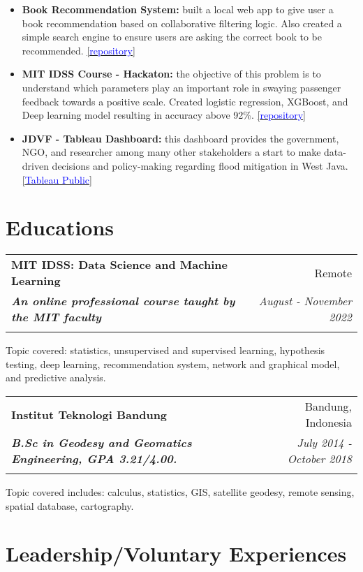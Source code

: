 \documentclass[a4paper, 11pt]{article}
\makeatletter
\newcommand{\resumeItem}[2]{
    \item\small{
        \textbf{#1}{#2 \vspace{-2pt}}
    }
}
\newcommand{\resumeSubheading}[4]{
    \vspace{-1pt}
    \begin{tabular*}{0.97\textwidth}{l@{\extracolsep{\fill}}r}
        \color{lightblue}\textbf{#1} & #2 \\
        \textbf{\textit{\small#3}} & \textit{\small #4} \\
        \textnormal{}\vspace{-5pt}
    \end{tabular*}\vspace{-5pt}
}
\newcommand{\resumeItemListStart}{\begin{itemize}[leftmargin=*]\setlength\itemsep{0em}\vspace{-1pt}}
\newcommand{\resumeItemListEnd}{\end{itemize}\vspace{-5pt}}
\makeatother
\begin{document}
    \resumeItemListStart
    \resumeItem{Book Recommendation System:}{ built a local web app to give user a book recommendation based on collaborative filtering logic.
    Also created a simple search engine to ensure users are asking the correct book to be recommended. 
    \href{https://github.com/amrirasyidi/book_recommendation}{[\textcolor{blue}{repository}]}}
    \resumeItem{MIT IDSS Course - Hackaton:}{ the objective of this problem is to understand which parameters play an important role in swaying
    passenger feedback towards a positive scale. Created logistic regression, XGBoost, and Deep learning model resulting in accuracy
    above 92\%. 
    \href{https://github.com/amrirasyidi/mit_idss_hackaton}{[\textcolor{blue}{repository}]}}
    \resumeItem{JDVF - Tableau Dashboard:}{ this dashboard provides the government, NGO, and researcher among many other stakeholders a start
    to make data-driven decisions and policy-making regarding flood mitigation in West Java. 
    \href{https://public.tableau.com/app/profile/faisal.putra/viz/Book1_16671939458310/DashboardFINAL}{[\textcolor{blue}{Tableau Public}]}}
    \resumeItemListEnd
    
    \vspace{-5pt}
    \section{Educations}

    \resumeSubheading
    {MIT IDSS: Data Science and Machine Learning}
    {Remote}
    {An online professional course taught by the MIT faculty}
    {August - November 2022}
    {Topic covered: statistics, unsupervised and supervised learning, hypothesis testing, 
    deep learning, recommendation system, network and graphical model, and predictive analysis.}
    
    \vspace{5pt}
    \resumeSubheading
    {Institut Teknologi Bandung}
    {Bandung, Indonesia}
    {B.Sc in Geodesy and Geomatics Engineering, GPA 3.21/4.00.}
    {July 2014 - October 2018}
    {Topic covered includes: calculus, statistics, GIS, satellite geodesy, 
    remote sensing, spatial database, cartography.}

    \vspace{-5pt}
    \section{Leadership/Voluntary Experiences}
\end{document}
